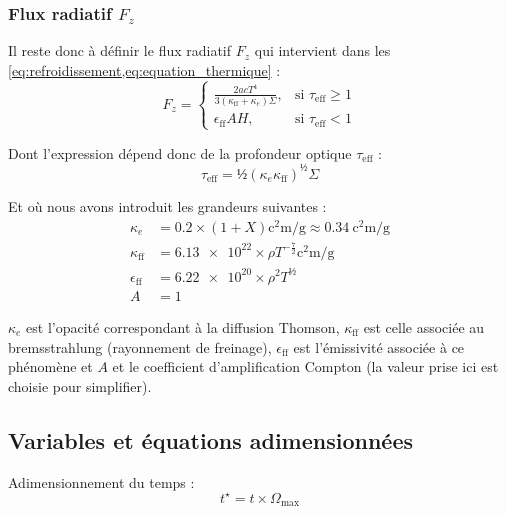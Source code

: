 \subsubsection{\texorpdfstring{Flux radiatif $F_z$}{Flux radiatif Fz}}

Il reste donc à définir le flux radiatif $F_z$ qui intervient dans les
\cref{eq:refroidissement,eq:equation_thermique} :
\begin{equation}
    \label{eq:flux}
    F_z =
    \begin{cases}
        \frac{2 a c T^4}{3 (\kappa_\mathrm{ff} + \kappa_e)\Sigma}, &\text{si $\tau_\mathrm{eff} \geq 1$} \\
        \epsilon_\mathrm{ff} A H, &\text{si $\tau_\mathrm{eff} < 1$}
    \end{cases}
\end{equation}

Dont l’expression dépend donc de la profondeur optique $\tau_\mathrm{eff}$ :
\begin{equation}
    \label{eq:tau_eff}
    \tau_\mathrm{eff} = ½ (\kappa_e \kappa_\mathrm{ff})^½ \Sigma
\end{equation}

Et où nous avons introduit les grandeurs suivantes :
\begin{align}
    \label{eq:opacite_thomson}
    \kappa_e &= \num{0.2} × (1+X) \si{\square\centi\meter\per\gram} \approx \SI{0.34}{\square\centi\meter\per\gram} \\
    \label{eq:opacite_bremsstrahlung}
    \kappa_\mathrm{ff} &= \num{6.13e22} × \rho T^{-\frac{7}{2}} \si{\square\centi\meter\per\gram}\\
    \label{eq:emissivite}
    \epsilon_\mathrm{ff} &= \num{6.22e20} × \rho^2 T^½ \\
    A &= 1
\end{align}

$\kappa_e$ est l’opacité correspondant à la diffusion Thomson,
$\kappa_\mathrm{ff}$ est celle associée au bremsstrahlung (rayonnement de
freinage), $\epsilon_\mathrm{ff}$ est l’émissivité associée à ce phénomène et
$A$ et le coefficient d’amplification Compton (la valeur prise ici est choisie
pour simplifier).

\subsection{Variables et équations adimensionnées}

Adimensionnement du temps :
\begin{equation}
    t^\star = t × \Omega_\mathrm{max}
\end{equation}

